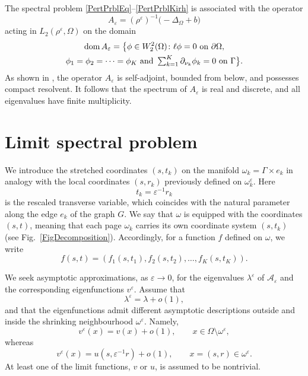 \documentclass[reqno]{amsart}
\theoremstyle{definition}
\theoremstyle{remark}
\numberwithin{equation}{section}
\newcommand{\dmn}{\mathop{\rm dom}}
\newcommand{\eps}{\varepsilon}
\newcommand{\cA}{\mathcal{A}}
\newcommand{\ve}{v^\eps}
\begin{document}
The spectral problem \eqref{PertPrblEq}--\eqref{PertPrblKirh} is associated with the  operator
\begin{equation*}
  A_\eps=(\rho^\eps)^{-1}\big(-\Delta_\Omega+b\big)
\end{equation*}
acting in $L_2(\rho^\eps,\Omega)$ on the domain
\begin{multline*}
    \dmn A_\eps=\big\{\phi\in W_2^2(\Omega)\colon \ell \phi=0 \text{ on } \partial\Omega,\\ \phi_1=\phi_2=\cdots=\phi_K\text{ and } \textstyle\sum_{k=1}^K\partial_{\nu_k}\phi_k=0 \text{ on } \Gamma \big\}.
\end{multline*}
As shown in \cite{GGP-JMAA2025}, the operator $A_\eps$ is self-adjoint, bounded from below, and possesses compact resolvent. It follows that the spectrum of $A_\eps$ is real and discrete, and all eigenvalues have finite multiplicity. 






\section{Limit spectral problem}\label{Section3}


We introduce the stretched coordinates $(s,t_k)$ on the manifold $\omega_k=\Gamma\times e_k$ in analogy with the local coordinates $(s,r_k)$ previously defined on $\omega_k^\eps$. Here 
$$
    t_k=\eps^{-1}r_k
$$
is the rescaled transverse variable, which coincides with the natural parameter along the edge $e_k$ of the graph $G$.
We  say that $\omega$ is equipped with the coordinates $(s,t)$, meaning that each page $\omega_k$ carries its own coordinate system $(s,t_k)$  (see Fig.~\ref{FigDecomposition}). Accordingly, for a function $f$ defined on $\omega$, we write
\begin{equation*}
  f(s,t)=(f_1(s,t_1),f_2(s,t_2),\dots, f_K(s,t_K)).
\end{equation*}


We seek asymptotic approximations, as $\eps\to0$, for the eigenvalues $\lambda^\eps$ of $\cA_\eps$ and the corresponding eigenfunctions $\ve$. Assume that
\begin{equation*}
\lambda^\eps=\lambda+o(1),
\end{equation*}
and that the eigenfunctions admit different asymptotic descriptions outside and inside the shrinking neighbourhood $\omega^\eps$. Namely,
\begin{equation*}
\ve(x)=v(x)+o(1),
\qquad
x\in\Omega\setminus\omega^\eps,
\end{equation*}
whereas
\begin{equation*}
\ve(x)=u(s,\eps^{-1}r)+o(1),
\qquad
x=(s,r)\in\omega^\eps.
\end{equation*}
At least one of the limit functions, $v$ or $u$, is assumed to be nontrivial.
\end{document}
